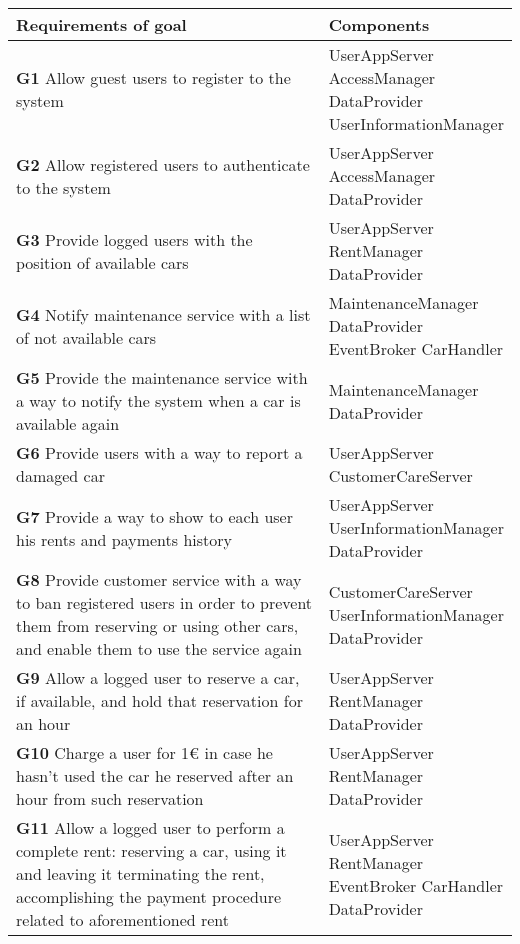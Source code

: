 \begin{longtable}{p{0.7\linewidth}p{0.3\linewidth}}
\toprule
\textbf{Requirements of goal} & \textbf{Components}\\
\midrule
\textbf{G1} Allow guest users to register to the system & \mbox{UserAppServer} \mbox{AccessManager} \mbox{DataProvider} \mbox{UserInformationManager}\\
\midrule
\textbf{G2} Allow registered users to authenticate to the system & \mbox{UserAppServer} \mbox{AccessManager} \mbox{DataProvider}\\
\midrule
\textbf{G3} Provide logged users with the position of available cars & \mbox{UserAppServer} \mbox{RentManager} \mbox{DataProvider}\\
\midrule
\textbf{G4} Notify maintenance service with a list of not available cars & \mbox{MaintenanceManager} \mbox{DataProvider}  \mbox{EventBroker} \mbox{CarHandler}\\
\midrule
\textbf{G5} Provide the maintenance service with a way to notify the system when a car is available again & \mbox{MaintenanceManager} \mbox{DataProvider}\\
\midrule
\textbf{G6} Provide users with a way to report a damaged car & \mbox{UserAppServer} \mbox{CustomerCareServer}\\
\midrule
\textbf{G7} Provide a way to show to each user his rents and payments history & \mbox{UserAppServer} \mbox{UserInformationManager} \mbox{DataProvider}\\
\midrule
\textbf{G8} Provide customer service with a way to ban registered users in order to prevent them from reserving or using other cars, and enable them to use the service again & \mbox{CustomerCareServer} \mbox{UserInformationManager} \mbox{DataProvider}\\
\midrule
\textbf{G9} Allow a logged user to reserve a car, if available, and hold that reservation for an hour & \mbox{UserAppServer} \mbox{RentManager} \mbox{DataProvider}\\
\midrule
\textbf{G10} Charge a user for 1\euro{} in case he hasn't used the car he reserved after an hour from such reservation & \mbox{UserAppServer} \mbox{RentManager} \mbox{DataProvider}\\
\midrule
\textbf{G11} Allow a logged user to perform a complete rent: reserving a car, using it and leaving it terminating the rent, accomplishing the payment procedure related to aforementioned rent & \mbox{UserAppServer} \mbox{RentManager} \mbox{EventBroker} \mbox{CarHandler} \mbox{DataProvider}\\

\end{longtable}
